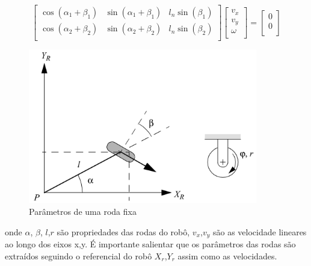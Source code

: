 \[
\begin{bmatrix}
    \cos(\alpha_{1} + \beta_{1}) &  \sin(\alpha_{1} + \beta_{1}) &  l_n\sin(\beta_{1}) \\
    \cos(\alpha_{2} + \beta_{2}) &  \sin(\alpha_{2} + \beta_{2})  &  l_n\sin(\beta_{2})\\
\end{bmatrix}
\begin{bmatrix}
    v_x \\
    v_y \\
    \omega\\
\end{bmatrix}
=
\begin{bmatrix}
    0 \\
    0 \\
\end{bmatrix}
\]
\begin{figure}[H]
    \label{fig:parametros:roda:fixa}
    \centering
    \includegraphics[width=10cm]{figuras/fixed_wheel_params.png}
    \caption{Parâmetros de uma roda fixa}
\end{figure}
onde $\alpha$, $\beta$, $l$,$r$ são propriedades das rodas do robô,
$v_x$,$v_y$ são as velocidade lineares ao longo dos eixos x,y.
É importante salientar que os parâmetros das
rodas são extraídos seguindo o referencial do robô $X_r$,$Y_r$ assim como
as velocidades.
